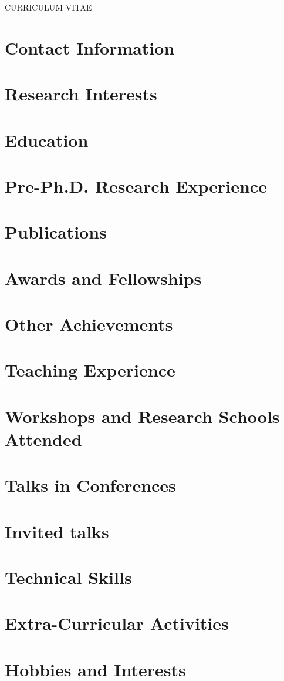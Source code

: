 \documentclass[margin,line]{res}
\begin{document}
\centerline{\Large CURRICULUM VITAE}


\begin{resume}
\section{\sc Contact Information}
    
\section{\sc Research Interests}
    
\section{\sc Education}
    
\section{\sc Pre-Ph.D. Research Experience}
    
\section{\sc Publications}
    
\section{\sc Awards and Fellowships}
    
\section{\sc Other Achievements}
    
\section{\sc Teaching Experience}
    
\section{\sc Workshops and Research Schools Attended}
    
\section{\sc Talks in Conferences}
    
\section{\sc Invited talks}
    
\section{\sc Technical Skills}
    
\section{\sc Extra-Curricular Activities}
    
\section{\sc Hobbies and Interests}
    
\end{resume}
\end{document}
